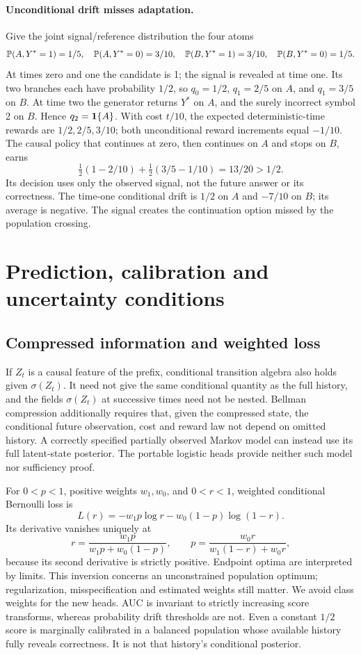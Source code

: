 \paragraph{Unconditional drift misses adaptation.}
Give the joint signal/reference distribution the four atoms
\[
 \mathbb P(A,Y^*=1)=1/5,\quad \mathbb P(A,Y^*=0)=3/10,\quad
 \mathbb P(B,Y^*=1)=3/10,\quad \mathbb P(B,Y^*=0)=1/5 .
\]
At times zero and one the candidate is 1; the signal is revealed at time one.
Its two branches each have probability \(1/2\), so
\(q_0=1/2\), \(q_1=2/5\) on \(A\), and \(q_1=3/5\) on \(B\).
At time two the generator returns \(Y^*\) on \(A\), and the surely incorrect
symbol 2 on \(B\). Hence \(q_2=\mathbf 1\{A\}\). With cost \(t/10\),
the expected deterministic-time rewards are \(1/2,2/5,3/10\);
both unconditional reward increments equal \(-1/10\).
The causal policy that continues at zero, then continues on \(A\) and stops
on \(B\), earns
\[
 \tfrac12(1-2/10)+\tfrac12(3/5-1/10)=13/20>1/2 .
\]
Its decision uses only the observed signal, not the future answer or its
correctness. The time-one conditional drift is \(1/2\) on \(A\) and
\(-7/10\) on \(B\); its average is negative. The signal creates the
continuation option missed by the population crossing.

\section{Prediction, calibration and uncertainty conditions}
\label{app:calibration}
\subsection{Compressed information and weighted loss}
If \(Z_t\) is a causal feature of the prefix, conditional transition algebra
also holds given \(\sigma(Z_t)\). It need not give the same conditional
quantity as the full history, and the fields \(\sigma(Z_t)\) at successive
times need not be nested. Bellman compression additionally requires that,
given the compressed state, the conditional future observation, cost and
reward law not depend on omitted history. A correctly specified partially
observed Markov model can instead use its full latent-state posterior.
The portable logistic heads provide neither such model nor sufficiency proof.

For \(0<p<1\), positive weights \(w_1,w_0\), and \(0<r<1\), weighted conditional
Bernoulli loss is
\[
 L(r)=-w_1p\log r-w_0(1-p)\log(1-r).
\]
Its derivative vanishes uniquely at
\[
 r=\frac{w_1p}{w_1p+w_0(1-p)},\qquad
 p=\frac{w_0r}{w_1(1-r)+w_0r},
\]
because its second derivative is strictly positive.
Endpoint optima are interpreted by limits. This inversion concerns an
unconstrained population optimum; regularization, misspecification and
estimated weights still matter. We avoid class weights for the new heads.
AUC is invariant to strictly increasing score transforms, whereas probability
drift thresholds are not. Even a constant \(1/2\) score is marginally
calibrated in a balanced population whose available history fully reveals
correctness. It is not that history's conditional posterior.

